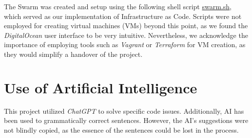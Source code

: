 The Swarm was created and setup using the following shell script \href{https://github.com/simonskodt/itu-minitwit/blob/feat-swarm/swarm.sh
}{swarm.sh}, which served as our implementation of Infrastructure as Code. Scripts were not employed for creating virtual machines (VMs) beyond this point, as we found the \textit{DigitalOcean} user interface to be very intuitive. Nevertheless, we acknowledge the importance of employing tools such as \textit{Vagrant} or \textit{Terraform} for VM creation, as they would simplify a handover of the project.

\section{Use of Artificial Intelligence} 

This project utilized \textit{ChatGPT} to solve specific code issues. Additionally, AI has been used to grammatically correct sentences. However, the AI's suggestions were not blindly copied, as the essence of the sentences could be lost in the process.